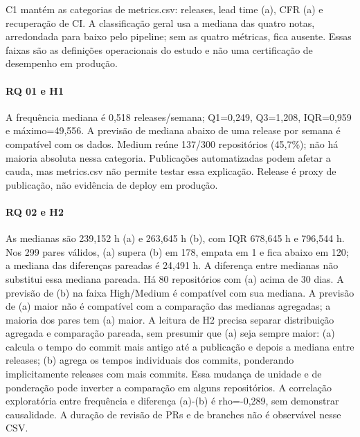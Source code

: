 C1 mantém as categorias de metrics.csv: releases, lead time (a), CFR (a) e recuperação de CI. A classificação geral usa a mediana das quatro notas, arredondada para baixo pelo pipeline; sem as quatro métricas, fica ausente. Essas faixas são as definições operacionais do estudo e não uma certificação de desempenho em produção.

\paragraph{RQ 01 e H1} A frequência mediana é 0,518 releases/semana; Q1=0,249, Q3=1,208, IQR=0,959 e máximo=49,556. A previsão de mediana abaixo de uma release por semana é compatível com os dados. Medium reúne 137/300 repositórios (45,7\%); não há maioria absoluta nessa categoria. Publicações automatizadas podem afetar a cauda, mas metrics.csv não permite testar essa explicação. Release é proxy de publicação, não evidência de deploy em produção.

\paragraph{RQ 02 e H2} As medianas são 239,152 h (a) e 263,645 h (b), com IQR 678,645 h e 796,544 h. Nos 299 pares válidos, (a) supera (b) em 178, empata em 1 e fica abaixo em 120; a mediana das diferenças pareadas é 24,491 h. A diferença entre medianas não substitui essa mediana pareada. Há 80 repositórios com (a) acima de 30 dias. A previsão de (b) na faixa High/Medium é compatível com sua mediana. A previsão de (a) maior não é compatível com a comparação das medianas agregadas; a maioria dos pares tem (a) maior. A leitura de H2 precisa separar distribuição agregada e comparação pareada, sem presumir que (a) seja sempre maior: (a) calcula o tempo do commit mais antigo até a publicação e depois a mediana entre releases; (b) agrega os tempos individuais dos commits, ponderando implicitamente releases com mais commits. Essa mudança de unidade e de ponderação pode inverter a comparação em alguns repositórios. A correlação exploratória entre frequência e diferença (a)-(b) é rho=-0,289, sem demonstrar causalidade. A duração de revisão de PRs e de branches não é observável nesse CSV.

